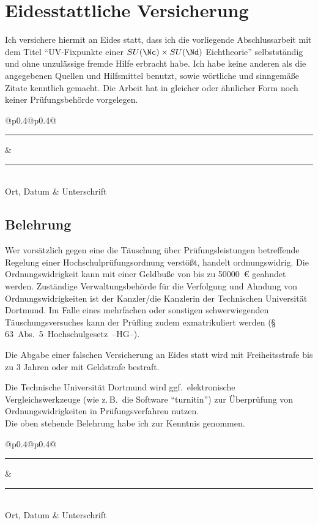 \section*{Eidesstattliche Versicherung}
Ich versichere hiermit an Eides statt, dass ich die vorliegende Abschlussarbeit mit dem Titel ``UV-Fixpunkte einer $SU(\Nc)\times SU(\Nd)$ Eichtheorie'' selbstständig und ohne unzulässige fremde Hilfe erbracht habe.
Ich habe keine anderen als die angegebenen Quellen und Hilfsmittel benutzt, sowie wörtliche und sinngemäße Zitate kenntlich gemacht. 
Die Arbeit hat in gleicher oder ähnlicher Form noch keiner Prüfungsbehörde vorgelegen.

\vspace*{1cm}\noindent
\begin{center}
  \begin{tabular}{@{}p{0.4\textwidth}@{\hspace{0.15\textwidth}}p{0.4\textwidth}@{}}
  \rule{\linewidth}{0.25pt}& \rule{\linewidth}{0.25pt}\\
  Ort, Datum & Unterschrift
  \end{tabular}
\end{center}

\subsection*{Belehrung}
Wer vorsätzlich gegen eine die Täuschung über Prüfungsleistungen betreffende Regelung einer Hochschulprüfungsordnung verstößt, handelt ordnungswidrig.
Die Ordnungswidrigkeit kann mit einer Geldbuße von bis zu \SI[round-mode=places, round-precision=2]{50000}{€} geahndet werden. 
Zuständige Verwaltungsbehörde für die Verfolgung und Ahndung von Ordnungswidrigkeiten ist der Kanzler/die Kanzlerin der Technischen Universität Dortmund. 
Im Falle eines mehrfachen oder sonstigen schwerwiegenden Täuschungsversuches kann der Prüfling zudem exmatrikuliert werden \mbox{(\S\,63 Abs. 5 Hochschulgesetz --HG--).}

Die Abgabe einer falschen Versicherung an Eides statt wird mit Freiheitsstrafe bis zu 3 Jahren oder mit Geldstrafe bestraft.

Die Technische Universität Dortmund wird ggf.\ elektronische Vergleichswerkzeuge (wie z.\,B.\ die Software ``turnitin'') zur Überprüfung von Ordnungswidrigkeiten in Prüfungsverfahren nutzen. \\[\baselineskip]

\noindent Die oben stehende Belehrung habe ich zur Kenntnis genommen.\\[1cm]
\begin{center}
\begin{tabular}{@{}p{0.4\textwidth}@{\hspace{0.15\textwidth}}p{0.4\textwidth}@{}}
\rule{\linewidth}{0.25pt}& \rule{\linewidth}{0.25pt}\\
Ort, Datum & Unterschrift
\end{tabular}
\end{center}